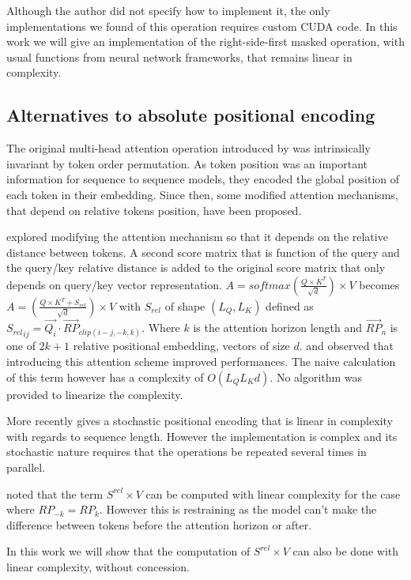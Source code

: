 Although the author did not specify how to implement it, the only
 implementations we found of this operation requires custom CUDA code. In
 this work we will give an implementation of the right-side-first masked
operation, with usual functions from neural network frameworks, that
remains linear in complexity.

\subsection{Alternatives to absolute positional
encoding}

The original multi-head attention operation introduced by
\citet{vaswani2017attention} was
intrinsically invariant by token order permutation. As token position was
an important information for sequence to sequence models, they encoded
the global position of each token in their embedding. Since then, some
modified attention mechanisms, that depend on relative tokens position,
have been proposed.

\citet{shaw2018selfattention} explored
modifying the attention mechanism so that it depends on the relative
distance between tokens. A second score matrix that is function of the
query and the query/key relative distance is added to the original score
matrix that only depends on query/key vector representation. $A = softmax\left(\frac{Q \times K^T}{\sqrt{d}}\right) \times V$ becomes
$A = \left(\frac{Q \times K^T + S_{rel}}{\sqrt{d}}\right) \times V$ with $S_{rel}$ of shape $(L_Q, L_K)$ defined as
${S_{rel}}_{ij} = \vec{Q_i} \cdotp \vec{RP}_{clip(i-j, -k, k)}$. Where $k$ is the attention horizon length and $\vec{RP}_n$ is one of
$2k+1$ relative positional embedding, vectors of size $d$.
\citet{shaw2018selfattention} and
\citet{huang2018music} observed that introducing this attention scheme improved performances.
The naive calculation of this term however has a complexity of
$O(L_QL_Kd)$. No algorithm was provided to linearize the complexity.

More recently \citet{liutkus2021relative} gives a stochastic positional encoding that is linear in
complexity with regards to sequence length. However the implementation
is complex and its stochastic nature requires that the operations be
repeated several times in parallel.

\citet{horn2021translational} noted that
the term $S^{rel} \times V$ can be computed with linear complexity for
the case where $RP_{-k} = RP_{k}$. However this is restraining as the
model can't make the difference between tokens before the attention
horizon or after.

In this work we will show that the computation of $S^{rel} \times V$
can also be done with linear complexity, without concession.

\endinput
